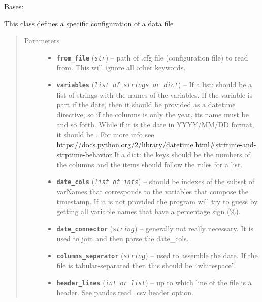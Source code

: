 \documentclass[a4paper,10pt,oneside]{sphinxmanual}
\begin{document}
\begin{fulllineitems}
\label{pymicra:pymicra.core.fileConfig}
Bases: 

This class defines a specific configuration of a data file
\begin{quote}\begin{description}
\item[{Parameters}] \leavevmode\begin{itemize}
\item {} 
\textbf{\texttt{from\_file}} (\emph{\texttt{str}}) -- path of .cfg file (configuration file) to read from. This will ignore all other
keywords.

\item {} 
\textbf{\texttt{variables}} (\emph{\texttt{list of strings or dict}}) -- If a list: should be a list of strings with the names of the variables. If the variable
is part if the date, then it should be provided as a datetime directive,
so if the columns is only the year, its name must be  and so forth. While
if it is the date in YYYY/MM/DD format, it should be . For more info
see \url{https://docs.python.org/2/library/datetime.html\#strftime-and-strptime-behavior}
If a dict: the keys should be the numbers of the columns and the items should follow
the rules for a list.

\item {} 
\textbf{\texttt{date\_cols}} (\emph{\texttt{list of ints}}) -- should be indexes of the subset of varNames that corresponds to the variables that compose
the timestamp. If it is not provided the program will try to guess by getting
all variable names that have a percentage sign (\%).

\item {} 
\textbf{\texttt{date\_connector}} (\emph{\texttt{string}}) -- generally not really necessary. It is used to join and then parse the date\_cols.

\item {} 
\textbf{\texttt{columns\_separator}} (\emph{\texttt{string}}) -- used to assemble the date. If the file is tabular-separated then this should be ``whitespace''.

\item {} 
\textbf{\texttt{header\_lines}} (\emph{\texttt{int or list}}) -- up to which line of the file is a header. See pandas.read\_csv header option.


\end{itemize}
\end{description}
\end{quote}
\end{fulllineitems}
\end{document}
